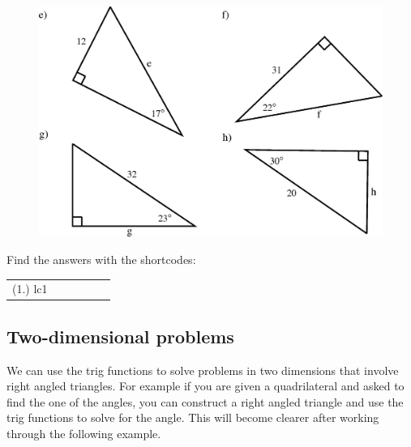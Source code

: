 	\begin{figure}[H] %
    \begin{center}
    \label{m39408*id816001!!!underscore!!!media}\label{m39408*id816001!!!underscore!!!printimage}\includegraphics{col11306.imgs/m39408_MG10C15_011.png} %
        
      \vspace{2pt}
    \vspace{.1in}
    
    \end{center}

 \end{figure}   

    \addtocounter{footnote}{-0}
    
              \par 
      

    
    \label{m39408*eip-403}
\par {} Find the answers with the shortcodes:
 \par \begin{tabular}[h]{cccccc}
 (1.) lc1  & \end{tabular}



            \subsection{ Two-dimensional problems}
            \nopagebreak
            \label{m39408*eip-153}
We can use the trig functions to solve problems in two dimensions that involve right angled triangles. For example if you are given a quadrilateral and asked to find the one of the angles, you can construct a right angled triangle and use the trig functions to solve for the angle. This will become clearer after working through the following example.
\par \label{m39408*eip-187}\vspace{.5cm} 
      
